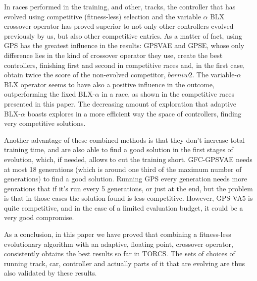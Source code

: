\documentclass[10pt,journal,compsoc]{IEEEtran}
\begin{document}

In races performed in the training, and other, tracks, the controller
that has evolved using competitive (fitness-less) selection and the
variable $\alpha$ BLX crossover operator has proved superior to not
only other controllers evolved previously by us, but also other
competitive entries. As a matter of fact, using GPS has the greatest 
influence in the results: {\sf GPSVAE} and {\sf GPSE}, whose only
difference lies in the kind of crossover operator they use, create the
best controllers, finishing first and second in competitive races and,
in the first case, obtain twice the score of the non-evolved
competitor, $berniw2$. The variable-$\alpha$ BLX operator seems to
have also a positive influence in the outcome, outperforming the fixed
BLX-$\alpha$ in a race, as shown in the competitive races presented in
this paper. The decreasing amount of exploration that adaptive
BLX-$\alpha$ boasts explores in a more efficient way the space of
controllers, finding very competitive solutions.

Another advantage of these combined methods is that they don't
increase total training time, and are also able to find a good
solution in the first stages of evolution, which, if needed, allows to
cut the training short. {\sf GFC-GPSVAE} needs at most 18 generations
(which is around one third of the maximum number of generations) to
find a good solution. Running GPS every generation needs more
genrations that if it's run every 5 generations, or just at the end,
but the problem is that in those cases the solution found is less
competitive. However, {\sf GPS-VA5} is quite competitive, and in the
case of a limited evaluation budget, it could be a very good
compromise.

As a conclusion, in this paper we have proved that combining a
fitness-less evolutionary algorithm with an adaptive, floating point,
crossover operator, consistently obtains the best results so far in
TORCS. The sets of choices of running track, car, controller and
actually parts of it that are evolving are thus also validated by
these results.
\end{document}

